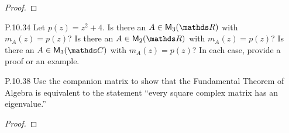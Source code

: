 \documentclass{../homework}
\begin{document}
\begin{problems}
  \begin{solution}
    \begin{proof}

    \end{proof}
  \end{solution}

\item[P.10.34] Let \(p(z) = z^2 + 4\).  Is there an
  \(A \in \M_3(\RR)\) with \(m_A(z) = p(z)\)?  Is there an
  \(A \in \M_2(\RR)\) with \(m_A(z) = p(z)\)?  Is there an
  \(A \in \M_3(\CC)\) with \(m_A(z) = p(z)\)?  In each case, provide a
  proof or an example.

  \begin{solution}

  \end{solution}

\item[P.10.38] Use the companion matrix to show that the Fundamental
  Theorem of Algebra is equivalent to the statement ``every square
  complex matrix has an eigenvalue.''

  \begin{solution}
    \begin{proof}

    \end{proof}
  \end{solution}


\end{problems}
\end{document}
